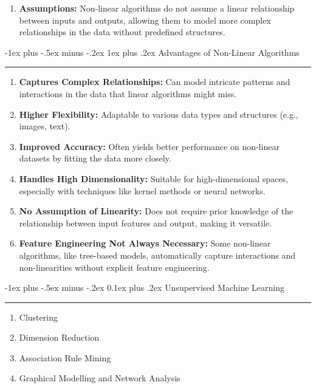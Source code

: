 \documentclass[letterpaper, 10.5pt,landscape]{article}
\makeatletter
\renewcommand{\section}{\@startsection{section}{1}{0mm}%
                                {-1ex plus -.5ex minus -.2ex}%
                                {0.1ex plus .2ex}%
                                {\normalfont\small}}
\renewcommand{\subsubsection}{\@startsection{subsubsection}{3}{0mm}%
                                {-1ex plus -.5ex minus -.2ex}%
                                {1ex plus .2ex}%
                                {\normalfont\small\bfseries}}
\makeatother
\begin{document}
\begin{multicols*}{3}
\begin{enumerate}
    \item \textbf{Assumptions:} 
    Non-linear algorithms do not assume a linear relationship between inputs and outputs, allowing them to model more complex relationships in the data without predefined structures.
\end{enumerate}



\subsubsection{Advantages of Non-Linear Algorithms} {\color{teal}\hrule height 0.5pt} \smallskip
\begin{enumerate}
    \item \textbf{Captures Complex Relationships:} 
    Can model intricate patterns and interactions in the data that linear algorithms might miss.
    
    \item \textbf{Higher Flexibility:} 
    Adaptable to various data types and structures (e.g., images, text).
    
    \item \textbf{Improved Accuracy:} 
    Often yields better performance on non-linear datasets by fitting the data more closely.
    
    \item \textbf{Handles High Dimensionality:} 
    Suitable for high-dimensional spaces, especially with techniques like kernel methods or neural networks.
    
    \item \textbf{No Assumption of Linearity:} 
    Does not require prior knowledge of the relationship between input features and output, making it versatile.
    
    \item \textbf{Feature Engineering Not Always Necessary:} 
    Some non-linear algorithms, like tree-based models, automatically capture interactions and non-linearities without explicit feature engineering.
\end{enumerate}







\section{Unsupervised Machine Learning} {\color{teal}\hrule height 1pt} \smallskip
\begin{enumerate}
    \item Clustering
    \vspace{-3pt}
    \item Dimension Reduction
    \vspace{-3pt}
    \item Association Rule Mining
    \vspace{-3pt}
    \item Graphical Modelling and Network Analysis
    \vspace{-3pt}
\end{enumerate}


\end{multicols*}
\end{document}
